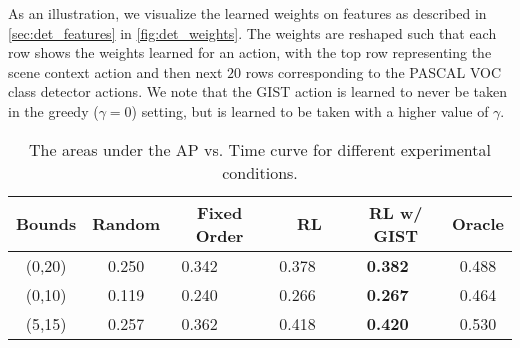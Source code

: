 

As an illustration, we visualize the learned weights on features as described in \autoref{sec:det_features} in \autoref{fig:det_weights}.
The weights are reshaped such that each row shows the weights learned for an action, with the top row representing the scene context action and then next $20$ rows corresponding to the PASCAL VOC class detector actions.
We note that the GIST action is learned to never be taken in the greedy ($\gamma=0$) setting, but is learned to be taken with a higher value of $\gamma$.

\begin{table}[t]
\caption{The areas under the AP vs. Time curve for different experimental conditions.}
\label{tab:results}
\centering
\begin{tabular}{|c|c|c|c|c|c|}
\hline
Bounds & Random & Fixed Order & RL        & RL w/ GIST         & Oracle \\ \hline
(0,20) & 0.250  & 0.342       & 0.378     & \textbf{0.382}  & 0.488 \\
(0,10) & 0.119  & 0.240       & 0.266     & \textbf{0.267}  & 0.464 \\
(5,15) & 0.257  & 0.362       & 0.418     & \textbf{0.420}  & 0.530 \\ \hline
\end{tabular}
\end{table}
